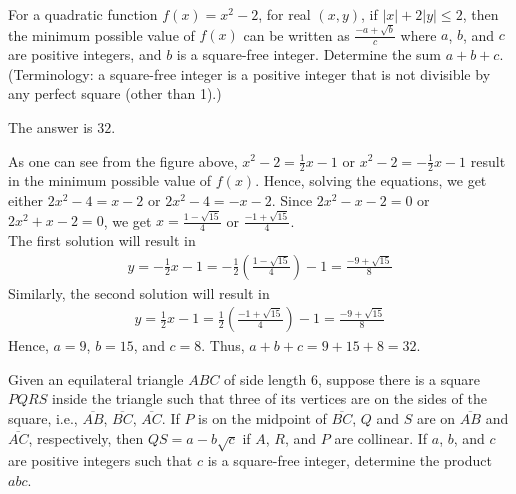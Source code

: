 \begin{problem}
For a quadratic function $f(x)=x^2-2$, for real $(x,y)$, if $|x|+2|y|\leq2$, then the minimum possible value of $f(x)$ can be written as $\frac{-a+\sqrt{b}}{c}$ where $a$, $b$, and $c$ are positive integers, and $b$ is a square-free integer. Determine the sum $a+b+c$. (Terminology: a square-free integer is a positive integer that is not divisible by any perfect square (other than 1).)
\end{problem}

\begin{solution}
The answer is $32$.\\
	\begin{center}
	\end{center}
As one can see from the figure above, $x^2-2=\frac{1}{2}x-1$ or $x^2-2=-\frac{1}{2}x-1$ result in the minimum possible value of $f(x)$. Hence, solving the equations, we get either $2x^2-4=x-2$ or $2x^2-4=-x-2$. Since $2x^2-x-2=0$ or $2x^2+x-2=0$, we get $x=\frac{1-\sqrt{15}}{4}$ or $\frac{-1+\sqrt{15}}{4}$.\\
\bigskip
The first solution will result in 
\begin{align*}
	y=-\frac{1}{2}x-1=-\frac{1}{2}\left(\frac{1-\sqrt{15}}{4}\right)-1=\frac{-9+\sqrt{15}}{8}
\end{align*}
Similarly, the second solution will result in 
\begin{align*}
	y=\frac{1}{2}x-1=\frac{1}{2}\left( \frac{-1+\sqrt{15}}{4} \right) -1 = \frac{-9+\sqrt{15}}{8}
\end{align*}
Hence, $a=9$, $b=15$, and $c=8$. Thus, $a+b+c=9+15+8=32$.\\
\end{solution}

\begin{problem}
Given an equilateral triangle $ABC$ of side length $6$, suppose there is a square $PQRS$ inside the triangle such that three of its vertices are on the sides of the square, i.e., $\overline{AB}$, $\overline{BC}$, $\overline{AC}$. If $P$ is on the midpoint of $\overline{BC}$, $Q$ and $S$ are on $\overline{AB}$ and $\overline{AC}$, respectively, then $QS=a-b\sqrt{c}$ if $A$, $R$, and $P$ are collinear. If $a$, $b$, and $c$ are positive integers such that $c$ is a square-free integer, determine the product $abc$.\\
\end{problem}

